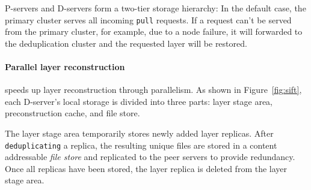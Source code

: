 P-servers and D-servers form a two-tier storage hierarchy:
In the default case, the primary cluster serves all incoming \texttt{pull} requests.
If a request can't be served from the primary cluster, for example, due to a node failure,
it will forwarded to the deduplication cluster and the requested layer will be restored.
%
%

\paragraph{Parallel layer reconstruction}

\sysname speeds up layer reconstruction through parallelism. As shown in Figure~\ref{fig:sift},
each D-server's local storage is divided into three parts: layer stage area, preconstruction cache,
and file store.
%

The layer stage area temporarily stores newly added layer replicas.
After \texttt{deduplicating} a replica, the resulting unique files are stored in a content 
addressable \emph{file store} and replicated to the peer servers to
provide redundancy. Once all replicas have been stored, the layer replica is deleted from the
layer stage area. 

